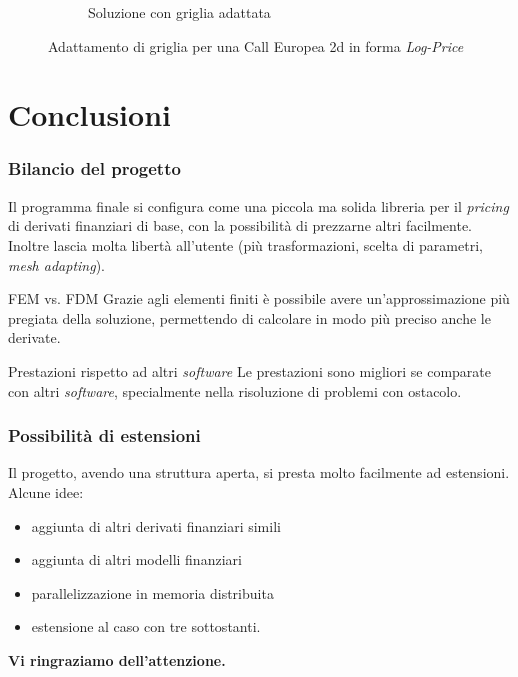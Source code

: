 \documentclass{beamer}
\begin{document}
\begin{frame}[c]
\begin{figure}
\begin{subfigure}{0.48\linewidth}
{  \caption{Soluzione con griglia adattata}}
 \end{subfigure}
 \caption{Adattamento di griglia per una Call Europea 2d in forma \emph{Log-Price}}
 \end{figure}
\end{frame}


\section{Conclusioni}

\begin{frame}
 \frametitle{Bilancio del progetto}
Il programma finale si configura come una piccola ma solida libreria per il \emph{pricing} di derivati finanziari di base, con la possibilit\`a di prezzarne altri facilmente. Inoltre lascia molta libertà all'utente (più trasformazioni, scelta di parametri, \emph{mesh adapting}).
\vspace{0.4cm}
\begin{block}{FEM vs. FDM}
Grazie agli elementi finiti \`e possibile avere un'approssimazione pi\`u pregiata della soluzione, permettendo di calcolare in modo pi\`u preciso anche le derivate.\\
\end{block}
\vspace{0.4cm}
\begin{block}{Prestazioni rispetto ad altri \emph{software}}
Le prestazioni sono migliori se comparate con altri \emph{software}, specialmente nella risoluzione di problemi con ostacolo.
\end{block}
\end{frame}


\begin{frame}
 \frametitle{Possibilità di estensioni}
 
 Il progetto, avendo una struttura aperta, si presta molto facilmente ad estensioni. Alcune idee:
 \begin{itemize}[<+->]
  \item aggiunta di altri derivati finanziari simili
  \item aggiunta di altri modelli finanziari
  \item parallelizzazione in memoria distribuita
  \item estensione al caso con tre sottostanti.
 \end{itemize}

 
\end{frame}



\begin{frame}[plain]
\centering
 \bf{\LARGE Vi ringraziamo dell'attenzione.}\\
\end{frame}
\end{document}
